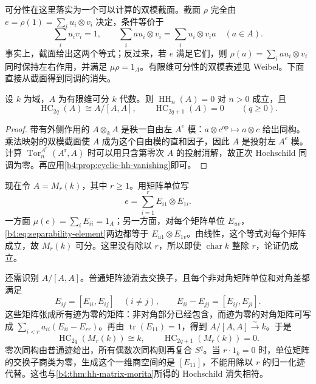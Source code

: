 可分性在这里落实为一个可以计算的双模截面。截面 \(\rho\) 完全由 \(e=\rho(1)=\sum_i u_i\otimes v_i\) 决定，条件等价于
\begin{equation}\label{b4:eq:separability-element}
	\sum_i u_i v_i=1,\qquad
	\sum_i a u_i\otimes v_i=\sum_i u_i\otimes v_i a\quad(a\in A).
\end{equation}
事实上，截面给出这两个等式；反过来，若 \(e\) 满足它们，则 \(\rho(a)=\sum_i a u_i\otimes v_i\) 同时保持左右作用，并满足 \(\mu\rho=1_A\)。有限维可分性的双模表述见 Weibel\cite[Theorem 9.2.11, pp. 310--311]{Weibel1994HomologicalAlgebra}。下面直接从截面得到同调的消失。

\begin{proposition}\label{b4:prop:separable-cyclic-homology}
	设 \(k\) 为域，\(A\) 为有限维可分 \(k\) 代数。则 \(\operatorname{HH}_n(A)=0\) 对 \(n>0\) 成立，且
	\[
		\operatorname{HC}_{2q}(A)\cong A/[A,A],\qquad
		\operatorname{HC}_{2q+1}(A)=0\qquad(q\ge0).
	\]
\end{proposition}
\begin{proof}
	带有外侧作用的 \(A\otimes_k A\) 是秩一自由左 \(A^e\) 模：\(a\otimes c^{\mathrm{op}}\mapsto a\otimes c\) 给出同构。乘法映射的双模截面使 \(A\) 成为这个自由模的直和因子，因此 \(A\) 是投射左 \(A^e\) 模。计算 \(\operatorname{Tor}^{A^e}_n(A^{\mathrm r},A)\) 时可以用只含第零次 \(A\) 的投射消解，故正次 Hochschild 同调为零。再应用\cref{b4:prop:cyclic-hh-vanishing}即可。
\end{proof}

现在令 \(A=M_r(k)\)，其中 \(r\ge1\)。用矩阵单位写
\[
	e=\sum_{i=1}^r E_{i1}\otimes E_{1i}.
\]
一方面 \(\mu(e)=\sum_iE_{ii}=1_A\)；另一方面，对每个矩阵单位 \(E_{uv}\)，\eqref{b4:eq:separability-element}两边都等于 \(E_{u1}\otimes E_{1v}\)。由线性，这个等式对每个矩阵成立，故 \(M_r(k)\) 可分。这里没有除以 \(r\)，所以即使 \(\operatorname{char}k\) 整除 \(r\)，论证仍成立。

\ProseParagraphBreak
还需识别 \(A/[A,A]\)。普通矩阵迹消去交换子，且每个非对角矩阵单位和对角差都满足
\[
	E_{ij}=[E_{ii},E_{ij}]\quad(i\ne j),\qquad
	E_{ii}-E_{jj}=[E_{ij},E_{ji}].
\]
这些矩阵张成所有迹为零的矩阵：非对角部分已经包含，而迹为零的对角矩阵可写成 \(\sum_{i<r}a_{ii}(E_{ii}-E_{rr})\)。再由 \(\operatorname{tr}(E_{11})=1\)，得到 \(A/[A,A]\xrightarrow{\sim}k\)。于是
\[
	\operatorname{HC}_{2q}(M_r(k))\cong k,\qquad
	\operatorname{HC}_{2q+1}(M_r(k))=0.
\]
零次同构由普通迹给出，所有偶数次同构则再复合 \(S^q\)。当 \(r\cdot1_k=0\) 时，单位矩阵的交换子商类为零，生成这个一维商空间的是 \([E_{11}]\)，不能用除以 \(r\) 的归一化迹代替。这也与\cref{b4:thm:hh-matrix-morita}所得的 Hochschild 消失相符。

